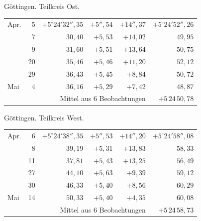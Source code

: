\noindent\begin{minipage}[t]{.495\textwidth}\centering Göttingen. Teilkreis Ost.\par\smallskip
{\scriptsize\setlength{\tabcolsep}{1pt}\renewcommand{\arraystretch}{1.2}\begin{tabular}{lr|r|r|r|r|}
Apr.&5&$+5^\circ24'32''{,}35$&$+5''{,}54$&$+14''{,}37$&$+5^\circ24'52''{,}26$\\
&7&$30{,}40$&$+5{,}53$&$+14{,}02$&$49{,}95$\\
&9&$31{,}60$&$+5{,}51$&$+13{,}64$&$50{,}75$\\
&20&$35{,}46$&$+5{,}46$&$+11{,}20$&$52{,}12$\\
&29&$36{,}43$&$+5{,}45$&$+8{,}84$&$50{,}72$\\
Mai&4&$36{,}16$&$+5{,}29$&$+7{,}42$&$48{,}87$\\
\cline{6-6}\multicolumn{5}{r}{Mittel aus 6 Beobachtungen}&$+5\,24\,50{,}78$
\end{tabular}}\end{minipage}\hfill\begin{minipage}[t]{.495\textwidth}\centering Göttingen. Teilkreis West.\par\smallskip
{\scriptsize\setlength{\tabcolsep}{1pt}\renewcommand{\arraystretch}{1.2}\begin{tabular}{lr|r|r|r|r}
Apr.&6&$+5^\circ24'38''{,}35$&$+5''{,}53$&$+14''{,}20$&$+5^\circ24'58''{,}08$\\
&8&$39{,}19$&$+5{,}31$&$+13{,}83$&$58{,}33$\\
&11&$37{,}81$&$+5{,}43$&$+13{,}25$&$56{,}49$\\
&27&$44{,}10$&$+5{,}63$&$+9{,}39$&$59{,}12$\\
&30&$46{,}33$&$+5{,}40$&$+8{,}56$&$60{,}29$\\
Mai&14&$50{,}33$&$+5{,}40$&$+4{,}35$&$60{,}08$\\
\cline{6-6}\multicolumn{5}{r}{Mittel aus 6 Beobachtungen}&$+5\,24\,58{,}73$
\end{tabular}}\end{minipage}
\par\vspace{4mm}

